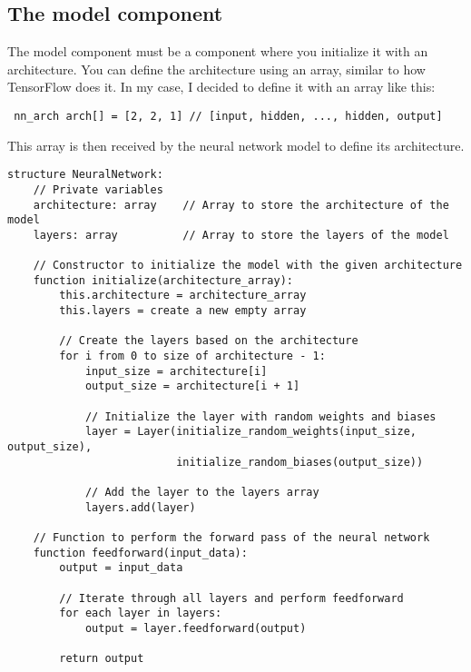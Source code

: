 \subsection{The model component}
The model component must be a component where you initialize it with an architecture. You can define the
architecture using an array, similar to how TensorFlow does it. In my case, I decided to define it with an
array like this:
\begin{verbatim}
 nn_arch arch[] = [2, 2, 1] // [input, hidden, ..., hidden, output]
\end{verbatim}
This array is then received by the neural network model to define its architecture.
\begin{verbatim}
structure NeuralNetwork:
    // Private variables
    architecture: array    // Array to store the architecture of the model
    layers: array          // Array to store the layers of the model

    // Constructor to initialize the model with the given architecture
    function initialize(architecture_array):
        this.architecture = architecture_array
        this.layers = create a new empty array

        // Create the layers based on the architecture
        for i from 0 to size of architecture - 1:
            input_size = architecture[i]
            output_size = architecture[i + 1]

            // Initialize the layer with random weights and biases
            layer = Layer(initialize_random_weights(input_size, output_size), 
                          initialize_random_biases(output_size))

            // Add the layer to the layers array
            layers.add(layer)

    // Function to perform the forward pass of the neural network
    function feedforward(input_data):
        output = input_data

        // Iterate through all layers and perform feedforward
        for each layer in layers:
            output = layer.feedforward(output)

        return output
\end{verbatim}

